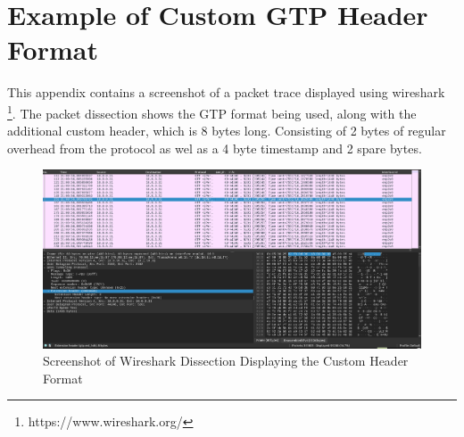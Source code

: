 
\cleardoublepage
\chapter{Example of Custom GTP Header Format}
\label{appendix:gtp}

This appendix contains a screenshot of a packet trace displayed using wireshark \footnote{https://www.wireshark.org/}. The packet dissection shows the GTP format being used, along with the additional custom header, which is 8 bytes long. Consisting of 2 bytes of regular overhead from the protocol as wel as a 4 byte timestamp and 2 spare bytes.

\begin{figure}[ht]
    \centering
	\includegraphics[width=\linewidth]{fig/gtp_packet.png}
	\caption{Screenshot of Wireshark Dissection Displaying the Custom Header Format}
	\label{fig:wshark}
\end{figure} 
